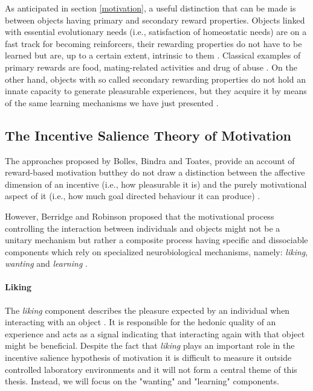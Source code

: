 As anticipated in section \ref{motivation}, a useful distinction that can be made is between objects having primary and secondary reward properties. Objects linked with essential evolutionary needs (i.e., satisfaction of homeostatic needs) are on a fast track for becoming reinforcers, their rewarding properties do not have to be learned but are, up to a certain extent, intrinsic to them \cite{sescousse2013processing}. Classical examples of primary rewards are food, mating-related activities and drug of abuse \cite{berridge2004motivation, simpson2016behavioral}. On the other hand, objects with so called secondary rewarding properties do not hold an innate capacity to generate pleasurable experiences, but they acquire it by means of the same learning mechanisms we have just presented \cite{sescousse2013processing}. 

\subsection{The Incentive Salience Theory of Motivation}
\label{incentive_salience}
The approaches proposed by Bolles, Bindra and Toates,  provide an account of reward-based motivation butthey do not draw a distinction between the affective dimension of an incentive (i.e., how pleasurable it is) and the purely motivational aspect of it (i.e., how much goal directed behaviour it can produce) \cite{bindra1978adaptive,toates1994comparing}. 

However, Berridge and Robinson proposed that the motivational process controlling the interaction between individuals and objects might not be a unitary mechanism but rather a composite process having specific and dissociable components which rely on specialized neurobiological mechanisms, namely: \emph{liking}, \emph{wanting} and \emph{learning} \cite{berridge1998role,berridge2009dissecting,smith2011disentangling}. 

\paragraph*{Liking}
\label{liking}
The \emph{liking} component describes the pleasure expected by an individual when interacting with an object \cite{berridge2009dissecting}. It is responsible for the hedonic quality of an experience and acts as a signal indicating that interacting again with that object might be beneficial. Despite the fact that \emph{liking} plays an important role in the incentive salience hypothesis of motivation it is difficult to measure it outside controlled laboratory environments \cite{berridge1998role} and it will not form a central theme of this thesis. Instead, we will focus on the "wanting" and "learning" components. 

